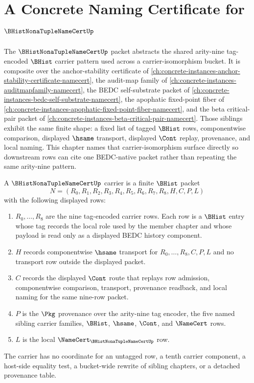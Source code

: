 \chapter{A Concrete Naming Certificate for $\BHistNonaTupleNameCertUp$}
\label{ch:concrete-instances-b-hist-nona-tuple-name-cert-namecert}

The $\BHistNonaTupleNameCertUp$ packet abstracts the shared arity-nine tag-encoded $\BHist$ carrier pattern used across a carrier-isomorphism bucket. It is composite over the anchor-stability certificate of \autoref{ch:concrete-instances-anchor-stability-certificate-namecert}, the audit-map family of \autoref{ch:concrete-instances-auditmapfamily-namecert}, the BEDC self-substrate packet of \autoref{ch:concrete-instances-bedc-self-substrate-namecert}, the apophatic fixed-point fiber of \autoref{ch:concrete-instances-apophatic-fixed-point-fiber-namecert}, and the beta critical-pair packet of \autoref{ch:concrete-instances-beta-critical-pair-namecert}. Those siblings exhibit the same finite shape: a fixed list of tagged $\BHist$ rows, componentwise comparison, displayed $\hsame$ transport, displayed $\Cont$ replay, provenance, and local naming. This chapter names that carrier-isomorphism surface directly so downstream rows can cite one BEDC-native packet rather than repeating the same arity-nine pattern.

\begin{definition}
\label{def:b-hist-nona-tuple-name-cert-carrier}
A $\BHistNonaTupleNameCertUp$ carrier is a finite $\BHist$ packet
$$
N=(R_0,R_1,R_2,R_3,R_4,R_5,R_6,R_7,R_8,H,C,P,L)
$$
with the following displayed rows:
\begin{enumerate}
\item $R_0,\ldots,R_8$ are the nine tag-encoded carrier rows. Each row is a $\BHist$ entry whose tag records the local role used by the member chapter and whose payload is read only as a displayed BEDC history component.
\item $H$ records componentwise $\hsame$ transport for $R_0,\ldots,R_8,C,P,L$ and no transport row outside the displayed packet.
\item $C$ records the displayed $\Cont$ route that replays row admission, componentwise comparison, transport, provenance readback, and local naming for the same nine-row packet.
\item $P$ is the $\Pkg$ provenance over the arity-nine tag encoder, the five named sibling carrier families, $\BHist$, $\hsame$, $\Cont$, and $\NameCert$ rows.
\item $L$ is the local $\NameCert_{\BHistNonaTupleNameCertUp}$ row.
\end{enumerate}
The carrier has no coordinate for an untagged row, a tenth carrier component, a host-side equality test, a bucket-wide rewrite of sibling chapters, or a detached provenance table.
\end{definition}

